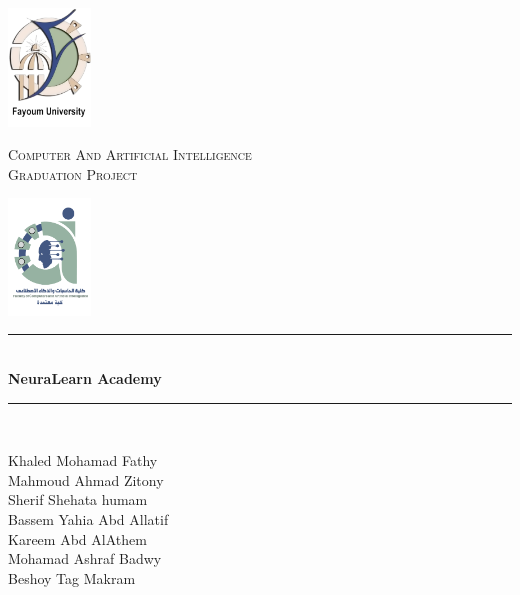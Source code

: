 \begin{titlepage} 
	\newcommand{\HRule}{\rule{\linewidth}{0.5mm}} %
	
	\begin{center}
		\begin{minipage}{0.15\textwidth}%
			\includegraphics[width=2.2cm]{content/Logo copy.png}
		\end{minipage}
		\begin{minipage}{0.69\textwidth}%
			\center
			\textsc{\large  Computer And Artificial Intelligence}\\[0.5cm]
			\textsc{\normalsize Graduation Project}\\[0.5cm]
		\end{minipage}\hfill
		\begin{minipage}{0.15\textwidth}%
			\includegraphics[width=2.2cm]{content/faculty.png}
        \end{minipage}
	\end{center}

	\center %
	
	\vspace{3cm}
	\HRule\\[0.4cm]
	
	{\huge\bfseries NeuraLearn Academy}\\[0.4cm] %
	
	\HRule\\[1.5cm]
	
	\begin{spacing}{1}
		\begin{center}
			\large
			Khaled Mohamad Fathy \\
			Mahmoud Ahmad Zitony\\ 
			Sherif Shehata humam\\
			Bassem Yahia Abd Allatif\\
			Kareem Abd AlAthem\\ 
			Mohamad Ashraf Badwy \\
			Beshoy Tag Makram
			\vspace{50mm}
		\end{center}
	\end{spacing}


\end{titlepage}
